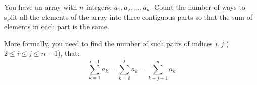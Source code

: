You have an array with $n$ integers: $a_1, a_2, ..., a_n$. Count the number of ways to
split all the elements of the array into three contiguous parts so that the sum of elements in
each part is the same.

More formally, you need to find the number of such pairs of indices $i,j$ ($2 \le i \le j \le
n-1$), that:
$$
  \sum_{k=1}^{i-1}a_k = \sum_{k=i}^{j}a_k = \sum_{k-j+1}^{n}a_k
$$
